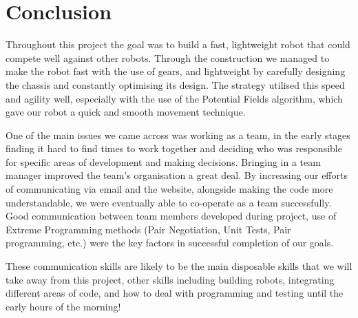\section{Conclusion}

Throughout this project the goal was to build a fast, lightweight robot that could compete well against other robots. Through the construction we managed to make the robot fast with the use of gears, and lightweight by carefully designing the chassis and constantly optimising its design. The strategy utilised this speed and agility well, especially with the use of the Potential Fields algorithm, which gave our robot a quick and smooth movement technique. \linebreak

One of the main issues we came across was working as a team, in the early stages finding it hard to find times to work together and deciding who was responsible for specific areas of development and making decisions. Bringing in a team manager improved the team's organisation a great deal. By increasing our efforts of communicating via email and the website, alongside making the code more understandable, we were eventually able to co-operate as a team successfully. Good communication between team members developed during project, use of Extreme Programming methods (Pair Negotiation, Unit Tests, Pair programming, etc.) were the key factors in successful completion of our goals.\linebreak

These communication skills are likely to be the main disposable skills that we will take away from this project, other skills including building robots, integrating different areas of code, and how to deal with programming and testing until the early hours of the morning!